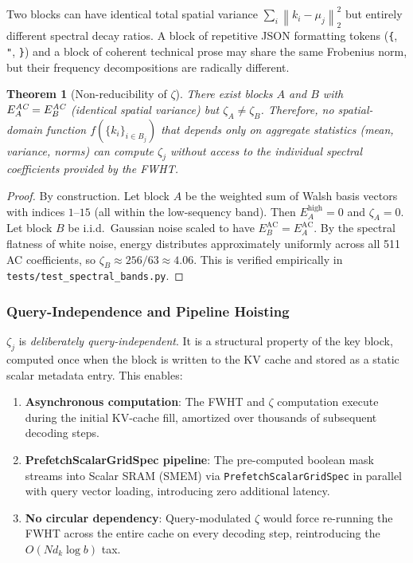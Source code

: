 \documentclass[conference,10pt]{IEEEtran}
\newtheorem{theorem}{Theorem}
\newcommand{\norm}[1]{\left\|#1\right\|}
\begin{document}
Two blocks can have identical total spatial variance
$\sum_{i} \norm{k_i - \mu_j}_2^2$ but entirely different spectral decay
ratios. A block of repetitive JSON formatting tokens (\texttt{\{}, \texttt{"},
\texttt{\}}) and a block of coherent technical prose may share the same
Frobenius norm, but their frequency decompositions are radically different.

\begin{theorem}[Non-reducibility of $\zeta$]\label{thm:zeta}
    There exist blocks $A$ and $B$ with
    $E_A^{\emph{AC}} = E_B^{\emph{AC}}$ (identical spatial variance) but
    $\zeta_A \neq \zeta_B$. Therefore, no spatial-domain function
    $f(\{k_i\}_{i \in B_j})$ that depends only on aggregate statistics
    (mean, variance, norms) can compute $\zeta_j$ without access to the
    individual spectral coefficients provided by the FWHT.
\end{theorem}

\begin{proof}
    By construction. Let block $A$ be the weighted sum of Walsh basis vectors
    with indices $1$--$15$ (all within the low-sequency band). Then
    $E_A^{\text{high}} = 0$ and $\zeta_A = 0$. Let block $B$ be i.i.d.\
    Gaussian noise scaled to have $E_B^{\text{AC}} = E_A^{\text{AC}}$.
    By the spectral flatness of white noise, energy distributes
    approximately uniformly across all 511 AC coefficients, so
    $\zeta_B \approx 256/63 \approx 4.06$. This is verified empirically
    in \texttt{tests/test\_spectral\_bands.py}.
\end{proof}

\subsubsection{Query-Independence and Pipeline Hoisting}

$\zeta_j$ is \emph{deliberately query-independent}. It is a structural property
of the key block, computed once when the block is written to the KV cache and
stored as a static scalar metadata entry. This enables:

\begin{enumerate}
    \item \textbf{Asynchronous computation}: The FWHT and $\zeta$ computation
          execute during the initial KV-cache fill, amortized over thousands of
          subsequent decoding steps.
    \item \textbf{PrefetchScalarGridSpec pipeline}: The pre-computed boolean
          mask streams into Scalar SRAM (SMEM) via
          \texttt{PrefetchScalarGridSpec} in parallel with query vector loading,
          introducing zero additional latency.
    \item \textbf{No circular dependency}: Query-modulated $\zeta$ would force
          re-running the FWHT across the entire cache on every decoding step,
          reintroducing the $O(Nd_k \log b)$ tax.
\end{enumerate}
\end{document}

